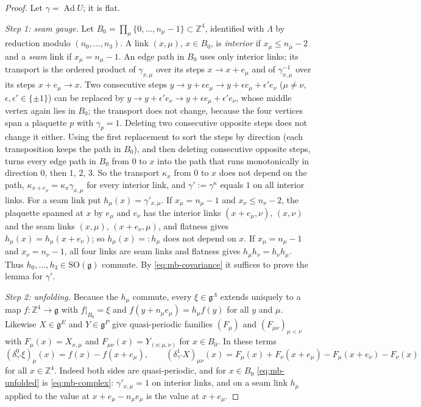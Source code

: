 \documentclass[11pt,a4paper]{amsart}
\theoremstyle{definition}
\theoremstyle{remark}
\numberwithin{equation}{section}
\newcommand{\Z}{\mathbb{Z}}          %
\begin{document}
\begin{proof}
Let $\gamma=\operatorname{Ad}U$; it is flat.

\emph{Step 1: seam gauge.} Let $B_0=\prod_\mu\{0,\dots,n_\mu-1\}\subset\Z^4$, identified with $\Lambda$ by reduction modulo $(n_0,\dots,n_3)$. A link $(x,\mu)$, $x\in B_0$, is \emph{interior} if $x_\mu\le n_\mu-2$ and a \emph{seam} link if $x_\mu=n_\mu-1$. An edge path in $B_0$ uses only interior links; its transport is the ordered product of $\gamma_{x,\mu}$ over its steps $x\to x+e_\mu$ and of $\gamma_{x,\mu}^{-1}$ over its steps $x+e_\mu\to x$. Two consecutive steps $y\to y+\epsilon e_\mu\to y+\epsilon e_\mu+\epsilon'e_\nu$ ($\mu\ne\nu$, $\epsilon,\epsilon'\in\{\pm1\}$) can be replaced by $y\to y+\epsilon'e_\nu\to y+\epsilon e_\mu+\epsilon'e_\nu$, whose middle vertex again lies in $B_0$; the transport does not change, because the four vertices span a plaquette $p$ with $\gamma_p=1$. Deleting two consecutive opposite steps does not change it either. Using the first replacement to sort the steps by direction (each transposition keeps the path in $B_0$), and then deleting consecutive opposite steps, turns every edge path in $B_0$ from $0$ to $x$ into the path that runs monotonically in direction $0$, then $1$, $2$, $3$. So the transport $\kappa_x$ from $0$ to $x$ does not depend on the path, $\kappa_{x+e_\mu}=\kappa_x\gamma_{x,\mu}$ for every interior link, and $\gamma':=\gamma^\kappa$ equals $1$ on all interior links. For a seam link put $h_\mu(x)=\gamma'_{x,\mu}$. If $x_\mu=n_\mu-1$ and $x_\nu\le n_\nu-2$, the plaquette spanned at $x$ by $e_\mu$ and $e_\nu$ has the interior links $(x+e_\mu,\nu)$, $(x,\nu)$ and the seam links $(x,\mu)$, $(x+e_\nu,\mu)$, and flatness gives $h_\mu(x)=h_\mu(x+e_\nu)$; so $h_\mu(x)=:h_\mu$ does not depend on $x$. If $x_\mu=n_\mu-1$ and $x_\nu=n_\nu-1$, all four links are seam links and flatness gives $h_\mu h_\nu=h_\nu h_\mu$. Thus $h_0,\dots,h_3\in\mathrm{SO}(\mathfrak g)$ commute. By \eqref{eq:mb-covariance} it suffices to prove the lemma for $\gamma'$.

\emph{Step 2: unfolding.} Because the $h_\mu$ commute, every $\xi\in\mathfrak g^\Lambda$ extends uniquely to a map $f\colon\Z^4\to\mathfrak g$ with $f|_{B_0}=\xi$ and $f(y+n_\mu e_\mu)=h_\mu f(y)$ for all $y$ and $\mu$. Likewise $X\in\mathfrak g^E$ and $Y\in\mathfrak g^P$ give quasi-periodic families $(F_\mu)$ and $(F_{\mu\nu})_{\mu<\nu}$ with $F_\mu(x)=X_{x,\mu}$ and $F_{\mu\nu}(x)=Y_{(x;\mu,\nu)}$ for $x\in B_0$. In these terms
\begin{equation}\label{eq:mb-unfolded}
(\delta^0_{\gamma'}\xi)_\mu(x)=f(x)-f(x+e_\mu),\qquad(\delta^1_{\gamma'}X)_{\mu\nu}(x)=F_\mu(x)+F_\nu(x+e_\mu)-F_\mu(x+e_\nu)-F_\nu(x)
\end{equation}
for all $x\in\Z^4$. Indeed both sides are quasi-periodic, and for $x\in B_0$ \eqref{eq:mb-unfolded} is \eqref{eq:mb-complex}: $\gamma'_{x,\mu}=1$ on interior links, and on a seam link $h_\mu$ applied to the value at $x+e_\mu-n_\mu e_\mu$ is the value at $x+e_\mu$.


\end{proof}
\end{document}
